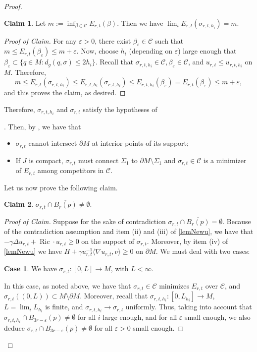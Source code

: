 \documentclass[12pt,a4paper,reqno]{amsart}
\theoremstyle{definition}
\newtheorem*{claim}{Claim}
\renewcommand{\leq}{\leqslant}
\renewcommand{\geq}{\geqslant}
\DeclareMathOperator{\Ric}{Ric}
\newcommand{\eps}{\varepsilon}
\begin{document}
{\begin{proof}
{\begin{claim}\label{claim:minimizingErt}
  Let $m:=\inf_{\beta\in\mathcal{C}}E_{r,t}(\beta)$. Then we have $\lim_i E_{r,t}(\sigma_{r,t,{h_i}}) = m$.
\end{claim} 
\begin{proof}[Proof of Claim]
   For any $\eps>0$, there exist $\beta_\eps\in\mathcal{C}$ such that $m\leq E_{r,t}(\beta_\eps)\leq m+\eps$. Now, choose $h_i$ (depending on $\eps$) large enough that $\beta_\eps\subset \{q\in M:d_g(q,\sigma)\leq 2h_i\}$. Recall that $\sigma_{r,t,h_i}\in \mathcal{C},\beta_\eps\in \mathcal{C}$, and $u_{r,t}\leq u_{r,t,h_i}$ on $M$. Therefore,
   \[
   m\leq E_{r,t}(\sigma_{r,t,h_i})\leq E_{r,t,h_i}(\sigma_{r,t,h_i})\leq E_{r,t,h_i}(\beta_\eps)=E_{r,t}(\beta_\eps) \leq m+\eps,
   \]
   and this proves the claim, as desired.
\end{proof}

Therefore, $\sigma_{r,t,h_i}$ and $\sigma_{r,t}$ satisfy the hypotheses of }. Then, by , we have  that 
\begin{itemize}
    \item $\sigma_{r,t}$ cannot intersect $\partial M$ at interior points of its support;
    \item If $J$ is compact, $\sigma_{r,t}$ must connect $\Sigma_1$ to $\partial M\setminus\Sigma_1$ and $\sigma_{r,t}\in \mathcal{C}$ is a minimizer of $E_{r,t}$ among competitors in $\mathcal{C}$.
\end{itemize}  

Let us now prove the following claim.
\begin{claim}
    $\sigma_{r,t} \cap \overline{B_r(p)} \neq \emptyset$.
\end{claim}
\begin{proof}[Proof of Claim]
Suppose for the sake of contradiction $\sigma_{r,t}\cap\overline{B_r(p)}=\emptyset$. Because of the contradiction assumption and item (ii) and (iii) of \cref{lemNewu}, we have that $-\gamma \Delta u_{r,t} + \Ric \cdot u_{r,t} \geq 0$ on the support of $\sigma_{r,t}$. Moreover, by item (iv) of \cref{lemNewu} we have $H+\gamma u_{r,t}^{-1}\langle \nabla u_{r,t},\nu\rangle\geq 0$ on $\partial M$. We must deal with two cases: 

\textbf{Case 1}. We have $\sigma_{r,t}:[0,L]\to M$, with $L<\infty$.

In this case, as noted above, we have that $\sigma_{r,t}\in\mathcal{C}$ minimizes $E_{r,t}$ over $\mathcal{C}$, and $\sigma_{r,t}((0,L))\subset M\setminus\partial M$. Moreover, recall that $\sigma_{r,t,h_i}:[0,L_{h_i}]\to M$, $L=\lim_i L_{h_i}$ is finite, and $\sigma_{r,t,h_i}\to \sigma_{r,t}$ uniformly. Thus, taking into account that $\sigma_{r,t,h_i}\cap B_{3r-\varepsilon}(p)\neq\emptyset$ for all $i$ large enough, and for all $\varepsilon$ small enough, we also deduce $\sigma_{r,t}\cap B_{3r-\varepsilon}(p)\neq \emptyset$ for all $\varepsilon>0$ small enough. 


\end{proof}
\end{proof}}
\end{document}
